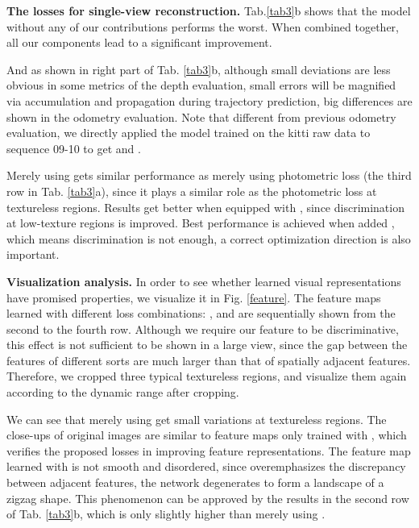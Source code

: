 \documentclass[runningheads]{llncs}
\begin{document}
\textbf{The losses for single-view reconstruction.}
Tab.\ref{tab3}b shows that the model without any of our contributions performs the worst. 
When combined together, all our components lead to a significant improvement.

And as shown in right part of Tab. \ref{tab3}b, although small deviations are less obvious in some metrics of the depth evaluation, small errors will be magnified via accumulation and propagation during trajectory prediction, big differences are shown in the odometry evaluation.
Note that different from previous odometry evaluation, we directly applied the model trained on the kitti raw data to sequence 09-10 to get  and .

Merely using  gets similar performance as merely using photometric loss (the third row in Tab. \ref{tab3}a), since it plays a similar role as the photometric loss at textureless regions.
Results get better when equipped with , since discrimination at low-texture regions is improved.
Best performance is achieved when added , which means discrimination is not enough, a correct optimization direction is also important.

\textbf{Visualization analysis.}
In order to see whether learned visual representations have promised properties, we visualize it in Fig. \ref{feature}.
The feature maps learned with different loss combinations: ,  and  are sequentially shown from the second to the fourth row.
Although we require our feature to be discriminative, this effect is not sufficient to be shown in a large view, since the gap between the features of different sorts are much larger than that of spatially adjacent features.
Therefore, we cropped three typical textureless regions, and visualize them again according to the dynamic range after cropping. 

We can see that merely using  get small variations at textureless regions.
The close-ups of original images are similar to feature maps only trained with , which verifies the proposed losses in improving feature representations.
The feature map learned with  is not smooth and disordered, since  overemphasizes the discrepancy between adjacent features, the network degenerates to form a landscape of a zigzag shape.
This phenomenon can be approved by the results in the second row of Tab. \ref{tab3}b, which is only slightly higher than merely using .
\end{document}
